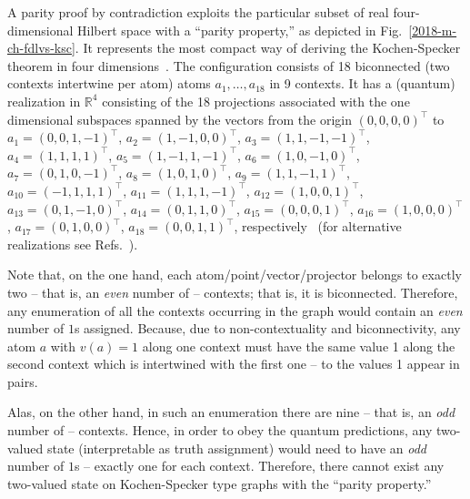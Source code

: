 {\color{OliveGreen}\bproof
A parity proof by contradiction
exploits the particular subset of real four-dimensional Hilbert space with a ``parity property,'' as depicted in Fig.~\ref{2018-m-ch-fdlvs-ksc}.
It represents the most compact way of deriving the Kochen-Specker theorem in four dimensions~\cite[-44mm]{cabello-96}.
The configuration consists of 18 biconnected (two contexts intertwine per atom)
atoms $a_1, \ldots , a_{18}$ in 9 contexts.
It has a (quantum) realization in $\mathbb{R}^4$
consisting of the 18 projections associated with the one dimensional subspaces spanned by
the vectors from the origin $(0,0,0,0)^\intercal$ to
$a_1=\left(   0,0,1,-1     \right)^\intercal    $,
$a_2=\left(   1,-1,0,0     \right)^\intercal    $,
$a_3=\left(   1,1,-1,-1    \right)^\intercal   $,
$a_4=\left(   1,1,1,1      \right)^\intercal     $,
$a_5=\left(   1,-1,1,-1    \right)^\intercal  $,
$a_6=\left(   1,0,-1,0     \right)^\intercal   $,
$a_7=\left(   0,1,0,-1   \right)^\intercal   $,
$a_8=\left(   1,0,1,0    \right)^\intercal    $,
$a_9=\left(   1,1,-1,1   \right)^\intercal   $,
$a_{10}=\left(-1,1,1,1   \right)^\intercal    $,
$a_{11}=\left(1,1,1,-1   \right)^\intercal    $,
$a_{12}=\left(1,0,0,1    \right)^\intercal     $,
$a_{13}=\left(0,1,-1,0   \right)^\intercal    $,
$a_{14}=\left(0,1,1,0    \right)^\intercal    $,
$a_{15}=\left(0,0,0,1    \right)^\intercal    $,
$a_{16}=\left(1,0,0,0    \right)^\intercal    $,
$a_{17}=\left(0,1,0,0    \right)^\intercal    $,
$a_{18}=\left(0,0,1,1    \right)^\intercal    $,
 respectively~\cite[-54mm]{cabello:210401}
(for alternative realizations see Refs.~\cite[-24mm]{cabello-99,cabello:210401}).




Note that, on the one hand,
each atom/point/vector/projector belongs
to exactly two -- that is, an {\em even} number of -- contexts; that is, it is biconnected.
Therefore,
any enumeration of  all the contexts occurring in the graph
would contain an {\em even} number of $1$s assigned.
Because, due to non-contextuality and biconnectivity,
any atom $a$ with $v(a)=1$ along one context must have the same value 1 along the second context
which is intertwined with the first one -- to the values 1 appear in pairs.

Alas, on the other hand, in such an enumeration
there are nine  -- that is, an {\em odd} number of -- contexts.
Hence,
in order to obey the quantum predictions,
any  two-valued state (interpretable as truth assignment)
would need to have an {\em odd} number of $1$s -- exactly one for each context.
Therefore, there cannot exist any two-valued state on Kochen-Specker type graphs with the  ``parity property.''

}
